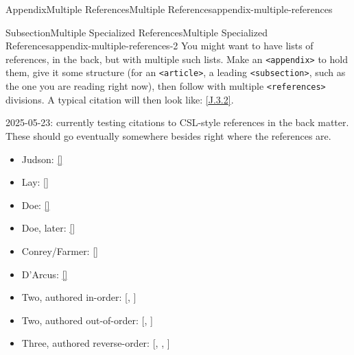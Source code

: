 \documentclass[twoside,10pt,]{article}
\newcommand{\xreffont}{\relax}
\newcommand{\mono}[1]{\texttt{#1}}
\numberwithin{equation}{section}
\begin{document}
\typeout{************************************************}
%
\begin{appendixptx}{Appendix}{Multiple References}{}{Multiple References}{}{}{appendix-multiple-references}
\renewcommand*{\appendixname}{Appendix}
%
%
\typeout{************************************************}
\typeout{************************************************}
%
\begin{subsectionptx}{Subsection}{Multiple Specialized References}{}{Multiple Specialized References}{}{}{appendix-multiple-references-2}
You might want to have lists of references, in the back, but with multiple such lists.  Make an \mono{<appendix>} to hold them, give it some structure (for an \mono{<article>}, a leading \mono{<subsection>}, such as the one you are reading right now), then follow with multiple \mono{<references>} divisions.  A typical citation will then look like: \hyperlink{biblio-strang-article-tres}{[{\xreffont J.3.2}]}.%
\par
2025-05-23: currently testing citations to CSL-style references in the back matter.  These should go eventually somewhere besides right where the references are.%
\begin{itemize}[label=\textbullet]
\item{}Judson: \hyperlink{biblio-judson-aata}{[{\xreffont 1}]}%
\item{}Lay: \hyperlink{biblio-lay-article}{[{\xreffont 2}]}%
\item{}Doe: \hyperlink{citeproc-py-item-3}{[{\xreffont 4}]}%
\item{}Doe, later: \hyperlink{citeproc-py-item-3-later}{[{\xreffont 3}]}%
\item{}Conrey\slash{}Farmer: \hyperlink{conrey-farmer}{[{\xreffont 5}]}%
\item{}D'Arcus: \hyperlink{citeproc-py-item-5}{[{\xreffont 6}]}%
\item{}Two, authored in-order: [\hyperlink{conrey-farmer}{{\xreffont 5}}, \hyperlink{citeproc-py-item-5}{{\xreffont 6}}]%
\item{}Two, authored out-of-order: [\hyperlink{citeproc-py-item-5}{{\xreffont 6}}, \hyperlink{conrey-farmer}{{\xreffont 5}}]%
\item{}Three, authored reverse-order: [\hyperlink{biblio-lay-article}{{\xreffont 2}}, \hyperlink{biblio-judson-aata}{{\xreffont 1}}, \hyperlink{citeproc-py-item-3}{{\xreffont 4}}]%
\end{itemize}
%
\end{subsectionptx}

\end{appendixptx}
\end{document}
